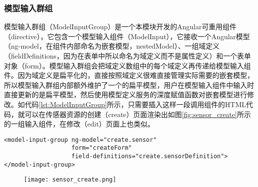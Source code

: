 \subsubsection{模型输入群组}
模型输入群组（ModelInputGroup）是一个本模块开发的Angular可重用组件（directive），它包含一个模型输入组件（ModelInput），它接收一个Angular模型（ng-model，在组件内部命名为嵌套模型，nestedModel）、一组域定义（fieldDefinitions，因为在表单中所以命名为域定义而不是属性定义）和一个表单对象（form）。模型输入群组会把域定义数组中的每个域定义再传递给模型输入组件。因为域定义是扁平化的，直接按照域定义很难直接管理实际需要的嵌套模型，所以模型输入群组内部额外维护了一个的扁平模型，用户在模型输入组件中输入时直接更新的是扁平模型，然后使用模型定义服务的深度赋值函数对嵌套模型进行修改。如代码\ref{lst:ModelInputGroup}所示，只需要插入这样一段调用组件的HTML代码，就可以在传感器资源的创建（create）页面渲染出如图\ref{fig:sensor_create}所示的一组输入组件，在修改（edit）页面上也类似。
\begin{lstlisting}[language={HTML5}, label={lst:ModelInputGroup}, caption={传感器创建页面中的模型输入群组代码}]
<model-input-group ng-model="create.sensor"
                   form="createForm"
                   field-definitions="create.sensorDefinition">
</model-input-group>
\end{lstlisting}
\begin{figure}[H]
 \centering
 \texttt{[image: sensor\_create.png]}
\end{figure}
